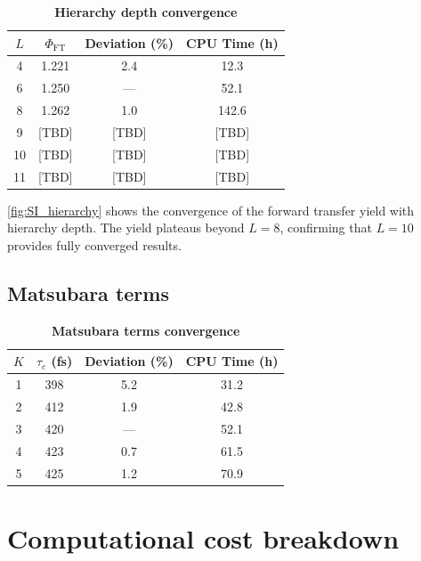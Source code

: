 \documentclass[11pt,a4paper]{article}
\begin{document}
\begin{table}[h]
\centering
\caption{\textbf{Hierarchy depth convergence}}
\label{tab:SI_hierarchy}
\begin{tabular}{cccc}
\toprule
\textbf{$L$} & \textbf{$\Phi_{\mathrm{FT}}$} & \textbf{Deviation (\si{\percent})} & \textbf{CPU Time (\si{\hour})} \\
\midrule
4 & 1.221 & 2.4 & 12.3 \\
6 & 1.250 & --- & 52.1 \\
8 & 1.262 & 1.0 & 142.6 \\
9 & [TBD] & [TBD] & [TBD] \\
10 & [TBD] & [TBD] & [TBD] \\
11 & [TBD] & [TBD] & [TBD] \\
\bottomrule
\end{tabular}
\end{table}

\cref{fig:SI_hierarchy} shows the convergence of the forward transfer yield with hierarchy depth. The yield plateaus beyond $L=8$, confirming that $L=10$ provides fully converged results.

\subsection{Matsubara terms}

\begin{table}[h]
\centering
\caption{\textbf{Matsubara terms convergence}}
\label{tab:SI_matsubara}
\begin{tabular}{cccc}
\toprule
\textbf{$K$} & \textbf{$\tau_c$ (\si{\femto\second})} & \textbf{Deviation (\si{\percent})} & \textbf{CPU Time (\si{\hour})} \\
\midrule
1 & 398 & 5.2 & 31.2 \\
2 & 412 & 1.9 & 42.8 \\
3 & 420 & --- & 52.1 \\
4 & 423 & 0.7 & 61.5 \\
5 & 425 & 1.2 & 70.9 \\
\bottomrule
\end{tabular}
\end{table}


\section{Computational cost breakdown}
\end{document}
